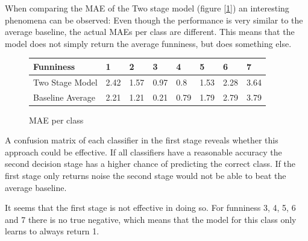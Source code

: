\documentclass[draft,final,oneside]{vutinfth} %
\begin{document}
When comparing the MAE of the Two stage model (figure [\ref{twostagemae}]) an interesting phenomena can be observed: Even though the performance is very similar to the average baseline, the actual MAEs per class are different. This means that the model does not simply return the average funniness, but does something else.

\begin{figure}
\centering
\begin{tabular}{|l|l|l|l|l|l|l|l|} 
\hline
\textbf{Funniness} 	& \textbf{1}	& \textbf{2}	& \textbf{3}	& \textbf{4}	& \textbf{5}	& \textbf{6}	& \textbf{7}  \\ 
\hline
Two Stage Model     & 2.42			&  1.57			& 0.97			& 0.8			& 1.53			& 2.28			& 3.64   \\
Baseline Average    & 2.21			& 1.21			& 0.21			& 0.79			& 1.79			& 2.79			& 3.79 \\	
\hline
\end{tabular}
\caption{MAE per class}
\label{twostagemae}
\end{figure}

A confusion matrix of each classifier in the first stage reveals whether this approach could be effective. If all classifiers have a reasonable accuracy the second decision stage has a higher chance of predicting the correct class. If the first stage only returns noise the second stage would not be able to beat the average baseline.

It seems that the first stage is not effective in doing so. For funniness 3, 4, 5, 6 and 7 there is no true negative, which means that the model for this class only learns to always return 1.
\end{document}
